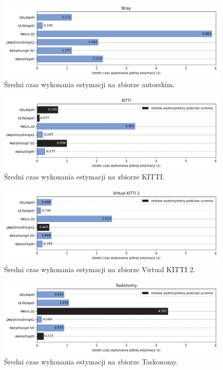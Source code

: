 \begin{figure}[H]
    \centering
    \includegraphics{plots/exec_time/3}
    \caption{Średni czas wykonania estymacji na zbiorze autorskim.}
    \label{fig:exec_time_3}
\end{figure}
\begin{figure}[H]
    \centering
    \includegraphics{plots/exec_time/4}
    \caption{Średni czas wykonania estymacji na zbiorze KITTI.}
    \label{fig:exec_time_4}
\end{figure}
\begin{figure}[H]
    \centering
    \includegraphics{plots/exec_time/5}
    \caption{Średni czas wykonania estymacji na zbiorze Virtual KITTI 2.}
    \label{fig:exec_time_5}
\end{figure}
\begin{figure}[H]
    \centering
    \includegraphics{plots/exec_time/6}
    \caption{Średni czas wykonania estymacji na zbiorze Taskonomy.}
    \label{fig:exec_time_6}
\end{figure}

